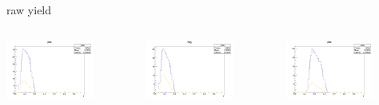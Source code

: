 \begin{frame}{raw yield}
\begin{columns}
\begin{column}[T]{0.25\textwidth}
\includegraphics[width = 0.7\textwidth]{results/yield/statistics/yield_x_Q2_z_0.35_4.000_0.40_pos.png}
\end{column}
\begin{column}[T]{0.25\textwidth}
\includegraphics[width = 0.7\textwidth]{results/yield/statistics/yield_x_Q2_z_0.35_4.000_0.40_neg.png}
\end{column}
\begin{column}[T]{0.25\textwidth}
\includegraphics[width = 0.7\textwidth]{results/yield/statistics/yield_x_Q2_z_0.35_4.000_0.50_pos.png}

\end{column}
\end{columns}
\end{frame}
